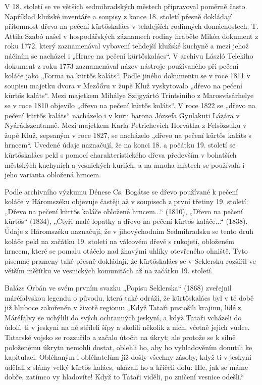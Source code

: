 V 18. století se ve větších sedmihradských městech připravoval poměrně
často. Například klužské inventáře a soupisy z konce 18. století přesně
dokládají přítomnost dřeva na pečení kürtőskalács v tehdejších rodinných
domácnostech. T. Attila Szabó našel v hospodářských záznamech rodiny
hraběte Mikóa dokument z roku 1772, který zaznamenával vybavení tehdejší
klužské kuchyně a mezi jehož náčiním se nacházel i „Hrnec na pečení
kürtőskalács``. V archivu László Telekiho dokument z roku 1773
zaznamenával název nástroje používaného při pečení koláče jako „Forma na
kürtős kaláts``. Podle jiného dokumentu se v roce 1811 v soupisu majetku
dvora v Mezőőru v župě Kluž vyskytovalo „dřevo na pečení kürtős
kaláts``. Mezi majetkem Mihálye Szijgyártó Trintsiniho z Marosvásárhelye
se v roce 1810 objevilo „dřevo na pečení kürtős koláts``. V roce 1822 se
„dřevo na pečení kürtős kaláts`` nacházelo i v kurii barona Józsefa
Gyulakuti Lázára v Nyárádszentanně. Mezi majetkem Karla Petrichevich
Horvátha z Felsőzsuku v župě Kluž, sepsaným v roce 1827, se nacházelo
„dřevo na pečení kürtős kaláts s hrncem``. Uvedené údaje naznačují, že
na konci 18. a počátku 19. století se kürtőskalács pekl s pomocí
charakteristického dřeva především v bohatších městských kuchyních a
vesnických kuriích, a na mnoha místech se používala i jeho varianta
obložená hrncem.

Podle archivního výzkumu Dénese Cs. Bogátse se dřevo používané k pečení
koláče v Háromszéku objevuje častěji až v soupisech z první třetiny 19.
století: „Dřevo na pečení kürtős kaláče obložené hrncem...`` (1810),
„Dřevo na pečení kürtős`` (1834), „Čtyři malé lopatky a dřevo na pečení
kürtős kaláče...`` (1838). Údaje z Háromszéku naznačují, že v
jihovýchodním Sedmihradsku se tento druh koláče pekl na začátku 19.
století na válcovém dřevě s rukojetí, obloženém hrncem, které se pomalu
otáčelo nad žhavými uhlíky otevřeného ohniště. Tyto písemné prameny také
přesně dokládají, že kürtőskalács se v Seklersku rozšířil ve větším
měřítku ve vesnických komunitách až na začátku 19. století.

Balázs Orbán ve svém prvním svazku „Popisu Seklerska`` (1868) zveřejnil
máréfalvskou legendu o původu, která také odráží, že kürtőskalács byl v
té době již hluboce zakořeněn v životě regionu: „Když Tataři pustošili
krajinu, lidé z Máréfalvy se uchýlili do svých ochranných jeskyní, a
když Tataři vcházeli do údolí, ti v jeskyni na ně stříleli šípy a
skolili několik z nich, včetně jejich vůdce. Tatarské vojsko se
rozzuřilo a začalo útočit na úkryt; ale protože se k silně položenému
úkrytu nemohli dostat, oblehli ho, aby ho vyhladověním donutili ke
kapitulaci. Obléhaným i obléhatelům již došly všechny zásoby, když ti v
jeskyni udělali z slámy velký kürtős kalács, ukázali ho a křičeli dolů:
Hle, jak se máme dobře, zatímco vy hladovíte! Když to Tataři viděli, po
zničení vesnice odešli.``

